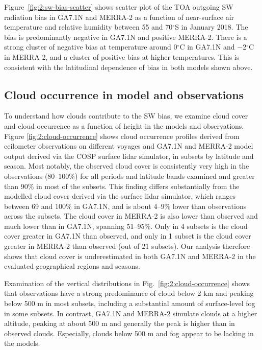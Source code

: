 Figure~\ref{fig:2:sw-bias-scatter} shows scatter plot of the TOA outgoing SW
radiation bias in GA7.1N and MERRA-2 as a function of near-surface air
temperature and relative humidity between 55 and 70$^\circ$S in January
2018. The bias is predominantly negative in GA7.1N and positive MERRA-2. There
is a strong cluster of negative bias at temperature around 0$^\circ$C in
GA7.1N and $-$2$^\circ$C in MERRA-2, and a cluster of positive bias at higher
temperatures. This is consistent with the latitudinal dependence of bias in
both models shown above.

\subsection{Cloud occurrence in model and observations}
\label{sec:2:cloud-occurrence}

To understand how clouds contribute to the SW bias, we examine cloud cover and
cloud occurrence as a function of height in the models and observations. Figure
\ref{fig:2:cloud-occurrence} shows cloud occurrence profiles derived from
ceilometer observations on different voyages and GA7.1N and MERRA-2 model
output derived via the COSP surface lidar simulator, in subsets by latitude and
season. Most notably, the observed cloud cover is consistently very high in the
observations (80--100\%) for all periods and latitude bands examined and
greater than 90\% in most of the subsets. This finding differs substantially
from the modelled cloud cover derived via the surface lidar simulator, which
ranges between 69 and 100\% in GA7.1N, and is about 4--9\% lower than
observations across the subsets. The cloud cover in MERRA-2 is also lower than
observed and much lower than in GA7.1N, spanning 51--95\%. Only in 4 subsets is
the cloud cover greater in GA7.1N than observed, and only in 1 subset is the
cloud cover greater in MERRA-2 than observed (out of 21 subsets).  Our analysis
therefore shows that cloud cover is underestimated in both GA7.1N and MERRA-2
in the evaluated geographical regions and seasons.

Examination of the vertical distributions in Fig.~\ref{fig:2:cloud-occurrence}
shows that observations have a strong predominance of cloud below 2 \unit{km}
and peaking below 500 m in most subsets, including a substantial amount
of surface-level fog in some subsets. In contrast, GA7.1N and MERRA-2 simulate
clouds at a higher altitude, peaking at about 500 \unit{m} and generally the
peak is higher than in observed clouds. Especially, clouds below 500 m and fog
appear to be lacking in the models.

